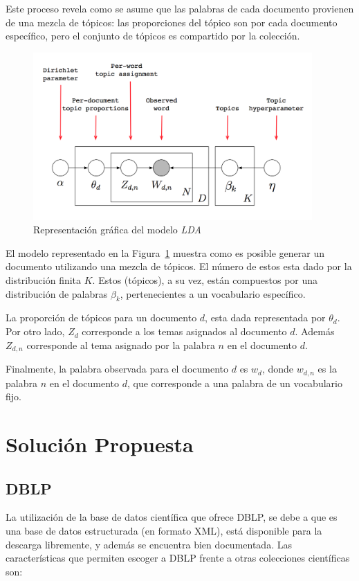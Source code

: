 \documentclass[12pt,oneside,letterpaper]{book}
\newcommand{\eng}[1]{\textit{#1}\xspace}			%
\newcommand{\abr}[1]{\textsc{#1}\xspace}           %
\theoremstyle{definition}
\begin{document}
Este proceso revela como se asume que las palabras de cada documento provienen de una mezcla de tópicos: las proporciones del tópico son por cada documento específico, pero el conjunto de tópicos es compartido por la colección.

\begin{figure}[h!]
	\centering
	\includegraphics[width=0.95\textwidth]{images/lda.png}
	\caption{Representación gráfica del modelo \eng{LDA}}
	\label{fig:lda}
\end{figure}   

El modelo representado en la Figura~\ref{fig:lda} muestra como es posible generar un documento utilizando una mezcla de tópicos. El número de estos esta dado por la distribución finita $K$. Estos (tópicos), a su vez, están compuestos por una distribución de palabras $\beta_k$, pertenecientes a un vocabulario específico. 

La proporción de tópicos para un documento $d$, esta dada representada por $\theta_d$. Por otro lado, $Z_d$ corresponde a los temas asignados al documento $d$. Además $Z_{d,n}$ corresponde al tema asignado por la palabra $n$ en el documento $d$. 

Finalmente, la palabra observada para el documento $d$ es $w_d$, donde $w_{d,n}$ es la palabra $n$ en el documento $d$, que corresponde a una palabra de un vocabulario fijo.


\chapter{Solución Propuesta}
\label{chap:solution_proposal}
\section{DBLP}
\label{sec:sol_dblp}
La utilización de la base de datos científica que ofrece DBLP, se debe a que es una base de datos estructurada (en formato XML), está disponible para la descarga libremente, y además se encuentra bien documentada. Las características que permiten escoger a \abr{DBLP} frente a otras colecciones científicas son:
\end{document}
